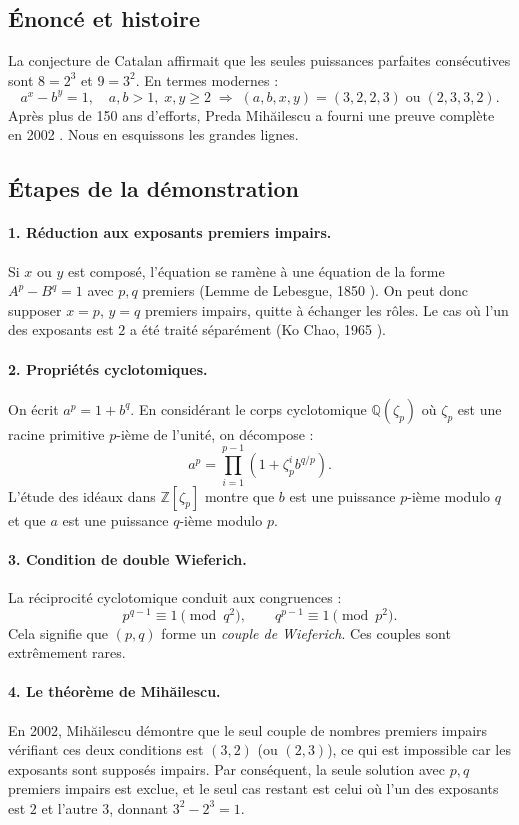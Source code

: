 \documentclass[12pt,a4paper]{article}
\theoremstyle{plain}
\theoremstyle{definition}
\begin{document}
\subsection{Énoncé et histoire}

La conjecture de Catalan affirmait que les seules puissances parfaites consécutives sont $8=2^3$ et $9=3^2$. En termes modernes :
\[
a^x - b^y = 1,\quad a,b>1,\; x,y\ge 2 \;\Longrightarrow\; (a,b,x,y)=(3,2,2,3) \;\text{ou}\; (2,3,3,2).
\]
Après plus de 150 ans d'efforts, Preda Mihăilescu a fourni une preuve complète en 2002 \cite{Mihailescu}. Nous en esquissons les grandes lignes.

\subsection{Étapes de la démonstration}

\paragraph{1. Réduction aux exposants premiers impairs.}  
Si $x$ ou $y$ est composé, l'équation se ramène à une équation de la forme $A^p - B^q = 1$ avec $p,q$ premiers (Lemme de Lebesgue, 1850 \cite{Lebesgue}). On peut donc supposer $x=p$, $y=q$ premiers impairs, quitte à échanger les rôles. Le cas où l'un des exposants est $2$ a été traité séparément (Ko Chao, 1965 \cite{Ko}).

\paragraph{2. Propriétés cyclotomiques.}  
On écrit $a^p = 1 + b^q$. En considérant le corps cyclotomique $\mathbb{Q}(\zeta_p)$ où $\zeta_p$ est une racine primitive $p$-ième de l'unité, on décompose :
\[
a^p = \prod_{i=1}^{p-1} (1 + \zeta_p^i b^{q/p}).
\]
L'étude des idéaux dans $\mathbb{Z}[\zeta_p]$ montre que $b$ est une puissance $p$-ième modulo $q$ et que $a$ est une puissance $q$-ième modulo $p$.

\paragraph{3. Condition de double Wieferich.}  
La réciprocité cyclotomique conduit aux congruences :
\[
p^{q-1} \equiv 1 \pmod{q^2},\qquad q^{p-1} \equiv 1 \pmod{p^2}.
\]
Cela signifie que $(p,q)$ forme un \emph{couple de Wieferich}. Ces couples sont extrêmement rares.

\paragraph{4. Le théorème de Mihăilescu.}  
En 2002, Mihăilescu démontre que le seul couple de nombres premiers impairs vérifiant ces deux conditions est $(3,2)$ (ou $(2,3)$), ce qui est impossible car les exposants sont supposés impairs. Par conséquent, la seule solution avec $p,q$ premiers impairs est exclue, et le seul cas restant est celui où l'un des exposants est $2$ et l'autre $3$, donnant $3^2 - 2^3 = 1$.
\end{document}
